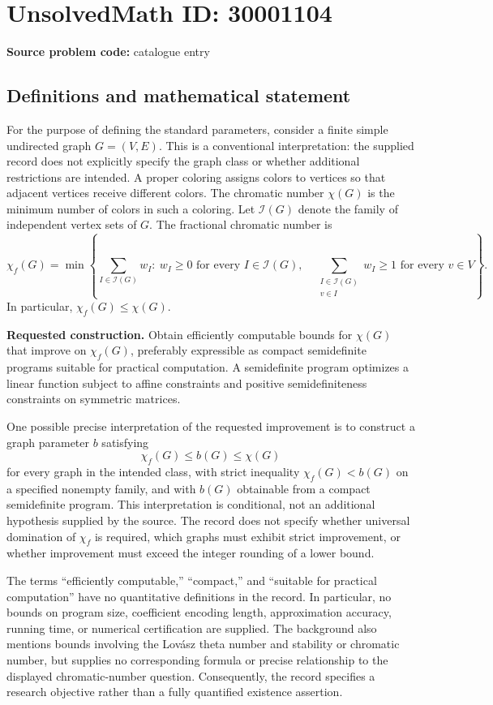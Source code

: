 \documentclass[11pt]{article}
\begin{document}
\section*{UnsolvedMath ID: 30001104}
\textbf{Source problem code:} catalogue entry
\subsection{Definitions and mathematical statement}
For the purpose of defining the standard parameters, consider a finite simple undirected graph \(G=(V,E)\). This is a conventional interpretation: the supplied record does not explicitly specify the graph class or whether additional restrictions are intended. A proper coloring assigns colors to vertices so that adjacent vertices receive different colors. The chromatic number \(\chi(G)\) is the minimum number of colors in such a coloring. Let \(\mathcal I(G)\) denote the family of independent vertex sets of \(G\). The fractional chromatic number is
\[
\chi_f(G)=\min\left\{\sum_{I\in\mathcal I(G)}w_I:\ w_I\geq0\text{ for every }I\in\mathcal I(G),\quad \sum_{\substack{I\in\mathcal I(G)\\v\in I}}w_I\geq1\text{ for every }v\in V\right\}.
\]
In particular, \(\chi_f(G)\leq\chi(G)\).

\textbf{Requested construction.} Obtain efficiently computable bounds for \(\chi(G)\) that improve on \(\chi_f(G)\), preferably expressible as compact semidefinite programs suitable for practical computation. A semidefinite program optimizes a linear function subject to affine constraints and positive semidefiniteness constraints on symmetric matrices.

One possible precise interpretation of the requested improvement is to construct a graph parameter \(b\) satisfying
\[
\chi_f(G)\leq b(G)\leq\chi(G)
\]
for every graph in the intended class, with strict inequality \(\chi_f(G)<b(G)\) on a specified nonempty family, and with \(b(G)\) obtainable from a compact semidefinite program. This interpretation is conditional, not an additional hypothesis supplied by the source. The record does not specify whether universal domination of \(\chi_f\) is required, which graphs must exhibit strict improvement, or whether improvement must exceed the integer rounding of a lower bound.

The terms ``efficiently computable,'' ``compact,'' and ``suitable for practical computation'' have no quantitative definitions in the record. In particular, no bounds on program size, coefficient encoding length, approximation accuracy, running time, or numerical certification are supplied. The background also mentions bounds involving the Lov\'asz theta number and stability or chromatic number, but supplies no corresponding formula or precise relationship to the displayed chromatic-number question. Consequently, the record specifies a research objective rather than a fully quantified existence assertion.
\end{document}
